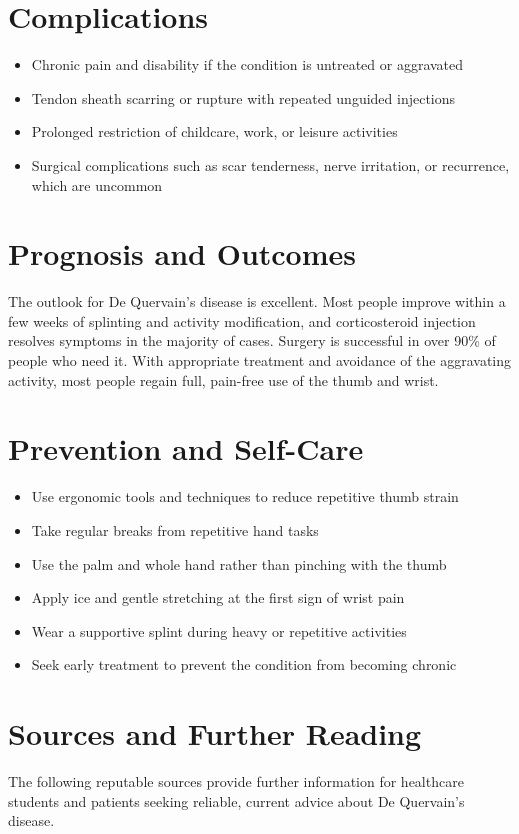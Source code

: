 \section*{Complications}
\begin{itemize}
    \item Chronic pain and disability if the condition is untreated or aggravated
    \item Tendon sheath scarring or rupture with repeated unguided injections
    \item Prolonged restriction of childcare, work, or leisure activities
    \item Surgical complications such as scar tenderness, nerve irritation, or recurrence, which are uncommon
\end{itemize}

\section*{Prognosis and Outcomes}
The outlook for De Quervain's disease is excellent. Most people improve within a few weeks of splinting and activity modification, and corticosteroid injection resolves symptoms in the majority of cases. Surgery is successful in over 90\% of people who need it. With appropriate treatment and avoidance of the aggravating activity, most people regain full, pain-free use of the thumb and wrist.

\section*{Prevention and Self-Care}
\begin{itemize}
    \item Use ergonomic tools and techniques to reduce repetitive thumb strain
    \item Take regular breaks from repetitive hand tasks
    \item Use the palm and whole hand rather than pinching with the thumb
    \item Apply ice and gentle stretching at the first sign of wrist pain
    \item Wear a supportive splint during heavy or repetitive activities
    \item Seek early treatment to prevent the condition from becoming chronic
\end{itemize}

\section*{Sources and Further Reading}
The following reputable sources provide further information for healthcare students and patients seeking reliable, current advice about De Quervain's disease.

